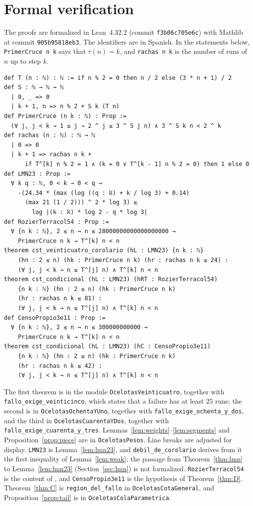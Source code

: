 \documentclass[11pt]{amsart}
\theoremstyle{definition}
\theoremstyle{remark}
\newcommand{\lean}[1]{\nolinkurl{#1}}
\begin{document}
\section{Formal verification}\label{sec:formal}

The proofs are formalized in Lean~4.32.2 (commit \lean{f3b06c705e6c}) with Mathlib at commit \lean{905b95818eb3}. The identifiers are in Spanish. In the statements below, \texttt{PrimerCruce n k} says that $\tau(n)=k$, and \texttt{rachas n k} is the number of runs of $n$ up to step $k$.

\begin{Verbatim}[fontsize=\small]
def T (n : ℕ) : ℕ := if n % 2 = 0 then n / 2 else (3 * n + 1) / 2
def S : ℕ → ℕ → ℕ
  | 0, _ => 0
  | k + 1, n => n % 2 + S k (T n)
def PrimerCruce (n k : ℕ) : Prop :=
  (∀ j, j < k → 1 ≤ j → 2 ^ j ≤ 3 ^ S j n) ∧ 3 ^ S k n < 2 ^ k
def rachas (n : ℕ) : ℕ → ℕ
  | 0 => 0
  | k + 1 => rachas n k +
      if T^[k] n % 2 = 1 ∧ (k = 0 ∨ T^[k - 1] n % 2 = 0) then 1 else 0
def LMN23 : Prop :=
  ∀ k q : ℕ, 0 < k → 0 < q →
    -(24.34 * (max (log ((q : ℝ) + k / log 3) + 0.14)
      (max 21 (1 / 2))) ^ 2 * log 3) ≤
        log |(k : ℝ) * log 2 - q * log 3|
def RozierTerracol54 : Prop :=
  ∀ {n k : ℕ}, 2 ≤ n → n ≤ 28000000000000000000 →
    PrimerCruce n k → T^[k] n < n
theorem cst_veinticuatro_corolario (hL : LMN23) {n k : ℕ}
    (hn : 2 ≤ n) (hk : PrimerCruce n k) (hr : rachas n k ≤ 24) :
    (∀ j, j < k → n ≤ T^[j] n) ∧ T^[k] n < n
theorem cst_condicional (hL : LMN23) (hRT : RozierTerracol54)
    {n k : ℕ} (hn : 2 ≤ n) (hk : PrimerCruce n k)
    (hr : rachas n k ≤ 81) :
    (∀ j, j < k → n ≤ T^[j] n) ∧ T^[k] n < n
def CensoPropio3e11 : Prop :=
  ∀ {n k : ℕ}, 2 ≤ n → n ≤ 300000000000 →
    PrimerCruce n k → T^[k] n < n
theorem cst_condicional (hL : LMN23) (hC : CensoPropio3e11)
    {n k : ℕ} (hn : 2 ≤ n) (hk : PrimerCruce n k)
    (hr : rachas n k ≤ 42) :
    (∀ j, j < k → n ≤ T^[j] n) ∧ T^[k] n < n
\end{Verbatim}

\noindent The first theorem is in the module \lean{OcelotasVeinticuatro}, together with \lean{fallo_exige_veinticinco}, which states that a failure has at least $25$ runs; the second is in \lean{OcelotasOchentaYUno}, together with \lean{fallo_exige_ochenta_y_dos}, and the third in \lean{OcelotasCuarentaYDos}, together with \lean{fallo_exige_cuarenta_y_tres}. Lemmas~\ref{lem:weights}--\ref{lem:segments} and Proposition~\ref{prop:piece} are in \lean{OcelotasPesos}. Line breaks are adjusted for display. \texttt{LMN23} is Lemma~\ref{lem:lmn23}, and \lean{debil_de_corolario} derives from it the first inequality of Lemma~\ref{lem:weak}; the passage from Theorem~\ref{thm:lmn} to Lemma~\ref{lem:lmn23} (Section~\ref{sec:lmn}) is not formalized. \texttt{RozierTerracol54} is the content of \cite[Corollary~5.4]{RT26}, and \texttt{CensoPropio3e11} is the hypothesis of Theorem~\ref{thm:D}. Theorem~\ref{thm:C} is \lean{region_del_fallo} in \lean{OcelotasCotaGeneral}, and Proposition~\ref{prop:tail} is in \lean{OcelotasColaParametrica}.
\end{document}
